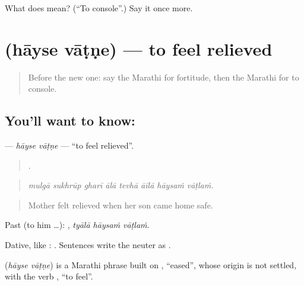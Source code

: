 \begin{tcolorbox}[breakable,colback=teal!4,colframe=teal!35!black,title={Before you move on}]
What does   mean? (\textquotedblleft{}To console\textquotedblright{}.) Say it once more.
\end{tcolorbox}
\section[\texorpdfstring{\mr{हायसे} \mr{वाटणे} (hāyse vāṭṇe)}{हायसे वाटणे (hāyse vāṭṇe)}]{  (hāyse vāṭṇe) — to feel relieved}

\label{lesson:MR-C458-hayse-vatne}



\begin{quote}
Before the new one: say the Marathi for fortitude, then the Marathi for to console.
\end{quote}

\subsection*{You'll want to know:  }
\textbf{ } — \emph{hāyse vāṭṇe} — \textquotedblleft{}to feel relieved\textquotedblright{}.

\begin{quote}
       .
\end{quote}

\begin{quote}
\emph{mulgā sukhrūp gharī ālā tevhā āīlā hāysaṁ vāṭlaṁ.}
\end{quote}

\begin{quote}
Mother felt relieved when her son came home safe.
\end{quote}

Past (to him …):   , \emph{tyālā hāysaṁ vāṭlaṁ}.

Dative, like :   . Sentences write the neuter as .

\begin{cousinweb}
\textbf{ } (\emph{hāyse vāṭṇe}) is a Marathi phrase built on , \textquotedblleft{}eased\textquotedblright{}, whose origin is not settled, with the verb , \textquotedblleft{}to feel\textquotedblright{}.
\end{cousinweb}

